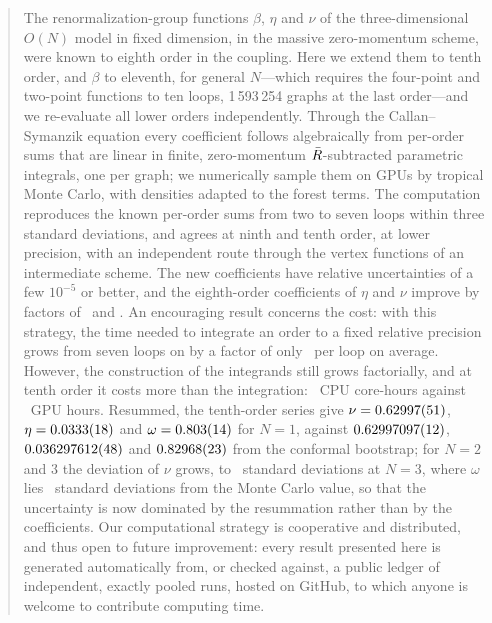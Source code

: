 \begin{abstract}
The renormalization-group functions $\beta$, $\eta$ and $\nu$ of the three-dimensional $O(N)$ model in fixed
dimension, in the massive zero-momentum scheme, were known to eighth order in the coupling. Here we extend them to
tenth order, and $\beta$ to eleventh, for general $N$---which requires the four-point and two-point functions to ten
loops, 1\,593\,254 graphs at the last order---and we re-evaluate all lower orders independently. Through the
Callan--Symanzik equation every coefficient follows algebraically from per-order sums that are linear in finite,
zero-momentum $\Rbar$-subtracted parametric integrals, one per graph; we numerically sample them on GPUs by tropical Monte Carlo, with densities adapted to the
forest terms. The computation reproduces the known per-order sums from two to seven loops within three standard
deviations, and agrees at ninth and tenth order, at lower precision, with an independent route through the vertex
functions of an intermediate scheme. The new
coefficients have relative uncertainties of a few $10^{-5}$ or better, and the eighth-order coefficients of $\eta$ and
$\nu$ improve by factors of \etaEightGain\ and \nuEightGain. An encouraging result concerns the cost: with this strategy,
the time needed to integrate an order to a fixed relative precision grows from seven loops on by a factor of only
\costgrowthrange\ per loop on average. However, the construction of the integrands still grows factorially, and at tenth order it costs more than the
integration: \costtenthcpu\ CPU core-hours against \costtenthgpu\ GPU hours. Resummed, the tenth-order series give
$\nu=\rsNuDNone$, $\eta=\rsEtaDNone$ and $\omega=\rsOmegaDNone$ for $N=1$, against $\rsBenchCBNuNone$,
$\rsBenchCBEtaNone$ and $\rsBenchCBOmegaNone$ from the conformal bootstrap; for $N=2$ and 3 the deviation of $\nu$ grows, to
\rsPullNuNthree\ standard deviations at $N=3$, where $\omega$ lies \rsPullOmegaNthree\ standard deviations from the
Monte Carlo value, so that the uncertainty is now dominated by the resummation
rather than by the coefficients. Our computational strategy is cooperative
and distributed, and thus open to future improvement: every result presented here is generated automatically from, or
checked against, a public ledger of independent, exactly pooled runs, hosted on GitHub, to which anyone is welcome to contribute
computing time.
\end{abstract}
